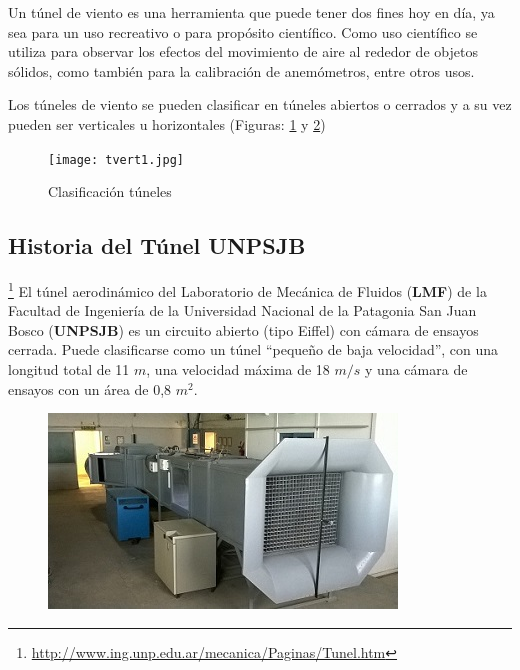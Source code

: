 

Un túnel de viento es una herramienta que puede tener dos fines hoy en día, ya sea para un uso recreativo o para propósito científico.
Como uso científico se utiliza para observar los efectos del movimiento de aire al rededor de objetos sólidos, como también para la calibración de anemómetros, entre otros usos.

Los túneles de viento se pueden clasificar en túneles abiertos o cerrados y a su vez pueden ser verticales u horizontales (Figuras: \ref{fig:tunelRec} y \ref{fig:abierto})


\begin{figure}[htb]
	\centering
	\texttt{[image: tvert1.jpg]}
	\label{fig:tunelRec}
\end{figure}

\begin{figure}[htbp]
    \centering
    \caption{Clasificación túneles} \label{fig:abierto}
    \end{figure}


\subsection{Historia del Túnel UNPSJB}


\footnote{\url{http://www.ing.unp.edu.ar/mecanica/Paginas/Tunel.htm}} 
	El túnel aerodinámico del Laboratorio de Mecánica de Fluidos (\textbf{LMF}) de la Facultad de Ingeniería de la Universidad Nacional de la Patagonia San Juan Bosco (\textbf{UNPSJB}) es un circuito abierto (tipo Eiffel) con cámara de ensayos cerrada. Puede clasificarse como un túnel “pequeño de baja velocidad”, con una longitud total de 11 $m$, una velocidad máxima de 18 $m/s$ y una cámara de ensayos con un área de 0,8 $m^2$.
	
	\begin{figure}[htb]
		\centering
		\includegraphics[scale=0.9]{tunel_unpsjb.JPG}
		\label{fig:tunelUni}
	\end{figure}
	
